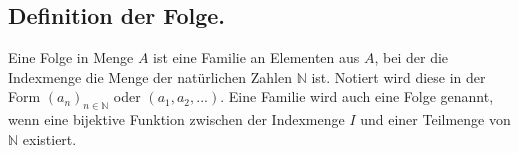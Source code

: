 \subsection{Definition der Folge.}
Eine Folge in Menge $A$ ist eine Familie an Elementen aus $A$, bei der die Indexmenge die Menge der natürlichen Zahlen $\mathbb{N}$ ist. Notiert wird diese in der Form $(a_n)_{n \in \mathbb{N}}$ oder $(a_1, a_2,...)$. Eine Familie wird auch eine Folge genannt, wenn eine bijektive Funktion zwischen der Indexmenge $I$ und einer Teilmenge von $\mathbb{N}$ existiert.